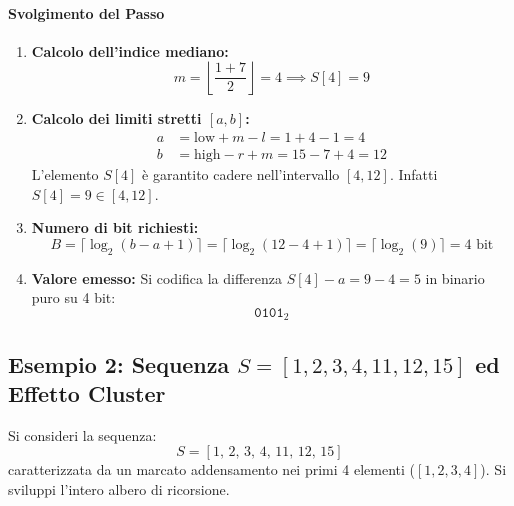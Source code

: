 \paragraph{Svolgimento del Passo}
\begin{enumerate}
  \item \textbf{Calcolo dell'indice mediano:}
  \begin{equation*}
    m = \left\lfloor \frac{1 + 7}{2} \right\rfloor = 4 \implies S[4] = 9
  \end{equation*}
  \item \textbf{Calcolo dei limiti stretti $[a, b]$:}
  \begin{align*}
    a &= \text{low} + m - l = 1 + 4 - 1 = 4 \\
    b &= \text{high} - r + m = 15 - 7 + 4 = 12
  \end{align*}
  L'elemento $S[4]$ \`e garantito cadere nell'intervallo $[4, 12]$. Infatti $S[4] = 9 \in [4, 12]$.
  \item \textbf{Numero di bit richiesti:}
  \begin{equation*}
    B = \lceil \log_2(b - a + 1) \rceil = \lceil \log_2(12 - 4 + 1) \rceil = \lceil \log_2(9) \rceil = 4 \text{ bit}
  \end{equation*}
  \item \textbf{Valore emesso:}
  Si codifica la differenza $S[4] - a = 9 - 4 = 5$ in binario puro su 4 bit:
  \begin{equation*}
    \texttt{0101}_2
  \end{equation*}
\end{enumerate}

\FloatBarrier
\subsection{Esempio 2: Sequenza $S = [1, 2, 3, 4, 11, 12, 15]$ ed Effetto Cluster}
\label{subsec:es2-interpolative-cluster}

\begin{example}
Si consideri la sequenza:
\begin{equation*}
  S = [1, \, 2, \, 3, \, 4, \, 11, \, 12, \, 15]
\end{equation*}
caratterizzata da un marcato addensamento nei primi 4 elementi ($[1, 2, 3, 4]$). Si sviluppi l'intero albero di ricorsione.
\end{example}

